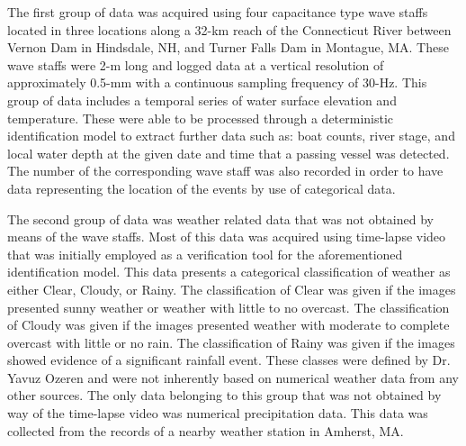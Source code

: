\documentclass[
10pt, %
letterpaper, %
twoside, %
headinclude,footinclude, %
BCOR5mm, %
]{scrartcl}
\begin{document}
The first group of data was acquired using four capacitance type wave staffs located in three locations along a 32-km reach of the Connecticut River between Vernon Dam in Hindsdale, NH, and Turner Falls Dam in Montague, MA. These wave staffs were 2-m long and logged data at a vertical resolution of approximately 0.5-mm with a continuous sampling frequency of 30-Hz. This group of data includes a temporal series of water surface elevation and temperature. These were able to be processed through a deterministic identification model \cite{simon2016boat} to extract further data such as: boat counts, river stage, and local water depth at the given date and time that a passing vessel was detected. The number of the corresponding wave staff was also recorded in order to have data representing the location of the events by use of categorical data.
 
The second group of data was weather related data that was not obtained by means of the wave staffs. Most of this data was acquired using time-lapse video that was initially employed as a verification tool for the aforementioned identification model. This data presents a categorical classification of weather as either Clear, Cloudy, or Rainy. The classification of Clear was given if the images presented sunny weather or weather with little to no overcast. The classification of Cloudy was given if the images presented weather with moderate to complete overcast with little or no rain. The classification of Rainy was given if the images showed evidence of a significant rainfall event. These classes were defined by Dr. Yavuz Ozeren and were not inherently based on numerical weather data from any other sources. The only data belonging to this group that was not obtained by way of the time-lapse video was numerical precipitation data. This data was collected from the records of a nearby weather station in Amherst, MA.
\end{document}

